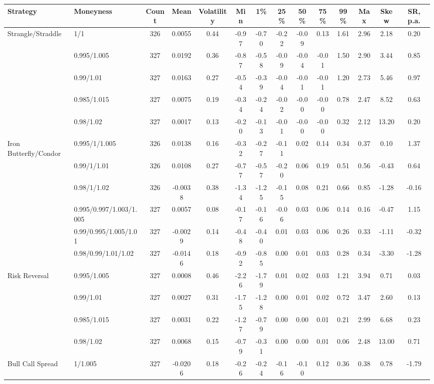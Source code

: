 \begin{tabular}{llcccccccccccc}
\toprule
Strategy & Moneyness & Count & Mean & Volatility & Min & 1\% & 25\% & 50\% & 75\% & 99\% & Max & Skew & SR, p.a. \\
\midrule
Strangle/Straddle & 1/1 & 326 & 0.0055 & 0.44 & -0.97 & -0.70 & -0.22 & -0.09 & 0.13 & 1.61 & 2.96 & 2.18 & 0.20 \\
 & 0.995/1.005 & 327 & 0.0192 & 0.36 & -0.87 & -0.58 & -0.09 & -0.04 & -0.01 & 1.50 & 2.90 & 3.44 & 0.85 \\
 & 0.99/1.01 & 327 & 0.0163 & 0.27 & -0.54 & -0.39 & -0.04 & -0.01 & -0.01 & 1.20 & 2.73 & 5.46 & 0.97 \\
 & 0.985/1.015 & 327 & 0.0075 & 0.19 & -0.34 & -0.24 & -0.02 & -0.00 & -0.00 & 0.78 & 2.47 & 8.52 & 0.63 \\
 & 0.98/1.02 & 327 & 0.0017 & 0.13 & -0.20 & -0.13 & -0.01 & -0.00 & -0.00 & 0.32 & 2.12 & 13.20 & 0.20 \\
Iron Butterfly/Condor & 0.995/1/1.005 & 326 & 0.0138 & 0.16 & -0.32 & -0.27 & -0.11 & 0.02 & 0.14 & 0.34 & 0.37 & 0.10 & 1.37 \\
 & 0.99/1/1.01 & 326 & 0.0108 & 0.27 & -0.77 & -0.57 & -0.20 & 0.06 & 0.19 & 0.51 & 0.56 & -0.43 & 0.64 \\
 & 0.98/1/1.02 & 326 & -0.0038 & 0.38 & -1.34 & -1.25 & -0.15 & 0.08 & 0.21 & 0.66 & 0.85 & -1.28 & -0.16 \\
 & 0.995/0.997/1.003/1.005 & 327 & 0.0057 & 0.08 & -0.17 & -0.16 & -0.06 & 0.03 & 0.06 & 0.14 & 0.16 & -0.47 & 1.15 \\
 & 0.99/0.995/1.005/1.01 & 327 & -0.0029 & 0.14 & -0.48 & -0.40 & 0.01 & 0.03 & 0.06 & 0.26 & 0.33 & -1.11 & -0.32 \\
 & 0.98/0.99/1.01/1.02 & 327 & -0.0146 & 0.18 & -0.92 & -0.85 & 0.00 & 0.01 & 0.03 & 0.28 & 0.34 & -3.30 & -1.28 \\
Risk Reversal & 0.995/1.005 & 327 & 0.0008 & 0.46 & -2.26 & -1.79 & 0.01 & 0.02 & 0.03 & 1.21 & 3.94 & 0.71 & 0.03 \\
 & 0.99/1.01 & 327 & 0.0027 & 0.31 & -1.75 & -1.28 & 0.00 & 0.01 & 0.02 & 0.72 & 3.47 & 2.60 & 0.13 \\
 & 0.985/1.015 & 327 & 0.0031 & 0.22 & -1.27 & -0.79 & 0.00 & 0.00 & 0.01 & 0.21 & 2.99 & 6.68 & 0.23 \\
 & 0.98/1.02 & 327 & 0.0068 & 0.15 & -0.79 & -0.31 & 0.00 & 0.00 & 0.01 & 0.06 & 2.48 & 13.00 & 0.71 \\
Bull Call Spread & 1/1.005 & 327 & -0.0206 & 0.18 & -0.26 & -0.24 & -0.16 & -0.10 & 0.12 & 0.36 & 0.38 & 0.78 & -1.79 \\

\end{tabular}
